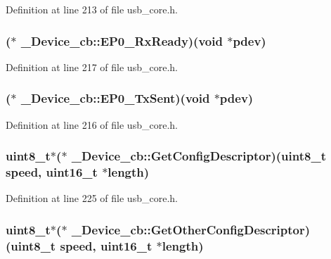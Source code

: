 Definition at line 213 of file usb\-\_\-core.\-h.

\hypertarget{struct___device__cb_a88cc8d66e3ccb037e515a76a37f5aae5}{
\subsubsection[{E\-P0\-\_\-\-Rx\-Ready}]{($\ast$ \-\_\-\-Device\-\_\-cb\-::\-E\-P0\-\_\-\-Rx\-Ready)({\bf void} $\ast$pdev)}}\label{struct___device__cb_a88cc8d66e3ccb037e515a76a37f5aae5}


Definition at line 217 of file usb\-\_\-core.\-h.

\hypertarget{struct___device__cb_af5e2e1683935d2e6655930e8857fbc1d}{
\subsubsection[{E\-P0\-\_\-\-Tx\-Sent}]{($\ast$ \-\_\-\-Device\-\_\-cb\-::\-E\-P0\-\_\-\-Tx\-Sent)({\bf void} $\ast$pdev)}}\label{struct___device__cb_af5e2e1683935d2e6655930e8857fbc1d}


Definition at line 216 of file usb\-\_\-core.\-h.

\hypertarget{struct___device__cb_a1a422e4eaf53cfd3d4208ddf7fdb64a1}{
\subsubsection[{Get\-Config\-Descriptor}]{ {\bf uint8\-\_\-t}$\ast$($\ast$ \-\_\-\-Device\-\_\-cb\-::\-Get\-Config\-Descriptor)({\bf uint8\-\_\-t} speed, {\bf uint16\-\_\-t} $\ast${\bf length})}}\label{struct___device__cb_a1a422e4eaf53cfd3d4208ddf7fdb64a1}


Definition at line 225 of file usb\-\_\-core.\-h.

\hypertarget{struct___device__cb_abcc9a422a304094e617d53181185e242}{
\subsubsection[{Get\-Other\-Config\-Descriptor}]{ {\bf uint8\-\_\-t}$\ast$($\ast$ \-\_\-\-Device\-\_\-cb\-::\-Get\-Other\-Config\-Descriptor)({\bf uint8\-\_\-t} speed, {\bf uint16\-\_\-t} $\ast${\bf length})}}\label{struct___device__cb_abcc9a422a304094e617d53181185e242}



